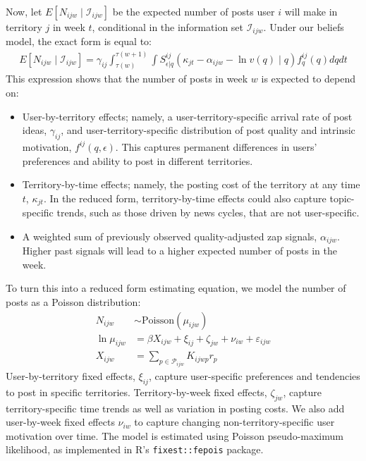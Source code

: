 Now, let $E \left[ N_{ijw} \mid \mathcal{I}_{ijw} \right]$ be the expected number of posts user $i$ will make in territory $j$ in week $t$, conditional in the information set $\mathcal{I}_{ijw}$. Under our beliefs model, the exact form is equal to:
\begin{align}
E \left[ N_{ijw} \mid \mathcal{I}_{ijw} \right] = \gamma_{ij} \int_{\tau(w)}^{\tau(w+1)} \int S_{\epsilon|q}^{ij} \left( \kappa_{jt} - \alpha_{ijw} - \ln v(q) \mid q \right) f_q^{ij}(q) dq dt \label{eq_v4v_EN}
\end{align}
This expression shows that the number of posts in week $w$ is expected to depend on:
\begin{itemize}
\item User-by-territory effects; namely, a user-territory-specific arrival rate of post ideas, $\gamma_{ij}$, and user-territory-specific distribution of post quality and intrinsic motivation, $f^{ij}(q,\epsilon)$. This captures permanent differences in users' preferences and ability to post in different territories.
\item Territory-by-time effects; namely, the posting cost of the territory at any time $t$, $\kappa_{jt}$. In the reduced form, territory-by-time effects could also capture topic-specific trends, such as those driven by news cycles, that are not user-specific.
\item A weighted sum of previously observed quality-adjusted zap signals, $\alpha_{ijw}$. Higher past signals will lead to a higher expected number of posts in the week.
\end{itemize}
To turn this into a reduced form estimating equation, we model the number of posts as a Poisson distribution:
\begin{align}
N_{ijw} & \sim \text{Poisson}(\mu_{ijw}) \nonumber \\
\ln \mu_{ijw} &= \beta X_{ijw} + \xi_{ij} + \zeta_{jw} + \nu_{iw} + \varepsilon_{ijw} \nonumber \\
X_{ijw} &= \sum_{p \in \mathcal{P}_{ijw}} K_{ijwp} r_{p}    \label{eq_v4v_estimator}
\end{align}
User-by-territory fixed effects, $\xi_{ij}$, capture user-specific preferences and tendencies to post in specific territories. Territory-by-week fixed effects, $\zeta_{jw}$, capture territory-specific time trends as well as variation in posting costs. We also add user-by-week fixed effects $\nu_{iw}$ to capture changing non-territory-specific user motivation over time. The model is estimated using Poisson pseudo-maximum likelihood, as implemented in R's \texttt{fixest::fepois} package.

